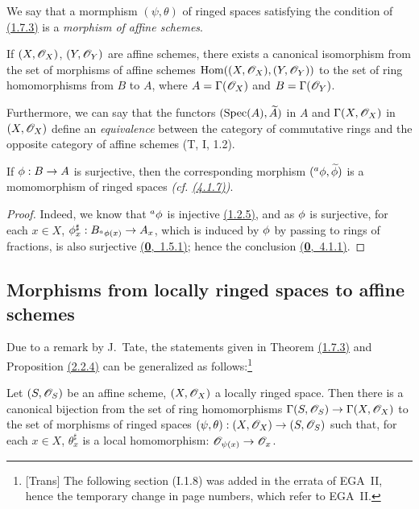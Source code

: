 We say that a mormphism $(\psi,\theta)$ of ringed spaces satisfying the condition of
\hyperref[thm-1.1.7.3]{(1.7.3)} is a {\em morphism of affine schemes}.

\begin{cor}[1.7.4]
\label{cor-1.1.7.4}
If $(X,\mathscr{O}_X)$, $(Y,\mathscr{O}_Y)$ are affine schemes, there exists a canonical isomorphism from
the set of morphisms of affine schemes ${\mathop{\mathrm{Hom}}\nolimits}((X,\mathscr{O}_X),(Y,\mathscr{O}_Y))$ to the set of
ring homomorphisms from $B$ to $A$, where $A=\Gamma(\mathscr{O}_X)$ and $B=\Gamma(\mathscr{O}_Y)$.
\end{cor}

Furthermore, we can say that the functors $({\mathop{\mathrm{Spec}}\nolimits}(A),\widetilde{A})$ in $A$ and
$\Gamma(X,\mathscr{O}_X)$ in $(X,\mathscr{O}_X)$ define an {\em equivalence} between the category of
commutative rings and the opposite category of affine schemes (T, I, 1.2).

\begin{cor}[1.7.5]
\label{cor-1.1.7.5}
If $\phi:B\to A$ is surjective, then the corresponding morphism
$({}^a\phi,\widetilde{\phi})$ is a momomorphism of ringed spaces
{\em (cf. \hyperref[env-1.4.1.7]{(4.1.7)})}.
\end{cor}

\begin{proof}
\label{proof-cor-1.1.7.5}
Indeed, we know that ${}^a\phi$ is injective \hyperref[env-1.1.2.5]{(1.2.5)}, and as $\phi$ is
surjective, for each $x\in X$, $\phi_x^\sharp:B_{{}^a\phi(x)}\to A_x$, which is induced
by $\phi$ by passing to rings of fractions, is also surjective \hyperref[env-0.1.5.1]{(\textbf{0},~1.5.1)}; hence
the conclusion \hyperref[env-0.4.1.1]{(\textbf{0},~4.1.1)}.
\end{proof}

\subsection{Morphisms from locally ringed spaces to affine schemes}
\label{subsection-morphisms-lrs-to-affine-schemes}

Due to a remark by J.~Tate, the statements given in Theorem \hyperref[thm-1.1.7.3]{(1.7.3)}
and Proposition \hyperref[prop-1.2.2.4]{(2.2.4)}
can be generalized as follows:\footnote{[Trans] The following section (I.1.8) was added in
the errata of EGA~II, hence the temporary change in page numbers, which refer to EGA~II.}

\begin{prop}[1.8.1]
\label{prop-1.1.8.1}
Let $(S,\mathscr{O}_S)$ be an affine scheme, $(X,\mathscr{O}_X)$ a locally ringed space. Then there is a
canonical bijection from the set of ring homomorphisms
$\Gamma(S,\mathscr{O}_S)\to\Gamma(X,\mathscr{O}_X)$ to the set of morphisms of ringed spaces
$(\psi,\theta):(X,\mathscr{O}_X)\to(S,\mathscr{O}_S)$ such that, for each $x\in X$, $\theta_x^\sharp$ is a
local homomorphism: $\mathscr{O}_{\psi(x)}\to\mathscr{O}_x$.
\end{prop}

